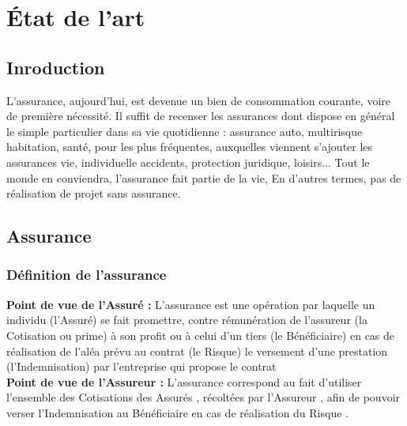 \chapter{État de l'art}

\section*{Inroduction}
    L'assurance, aujourd'hui, est devenue un bien de consommation courante, voire de première nécessité. Il suffit de recenser les assurances dont dispose en général le simple particulier dans sa vie quotidienne : assurance auto, multirisque habitation, santé, pour les plus fréquentes, auxquelles viennent s'ajouter les assurances vie, individuelle accidents, protection juridique, loisirs... Tout le monde en conviendra, l'assurance fait partie de la vie, En d'autres termes, pas de réalisation de projet sans assurance. 
    
\section{Assurance}
    \subsection{Définition de l'assurance}
    
                
        \begin{itemize}[font=\normalsize]
                \textbf{ Point de vue de l’Assuré : } L’assurance est une opération par laquelle un individu (l’Assuré) se fait promettre, contre rémunération de l’assureur (la Cotisation ou prime) à son profit ou à celui d’un tiers (le Bénéficiaire) en cas de réalisation de l’aléa prévu au contrat (le Risque)
                le versement d’une prestation (l’Indemnisation)
                par l’entreprise qui propose le contrat  \\
                
                 \textbf{ Point de vue de l’Assureur :} 
                L’assurance
correspond au fait d’utiliser l’ensemble
des
Cotisations des Assurés ,
récoltées par
l’Assureur ,
afin de pouvoir verser
l’Indemnisation
au
Bénéficiaire en cas de
réalisation du
Risque .\\
                
                
        \end{itemize}
    
